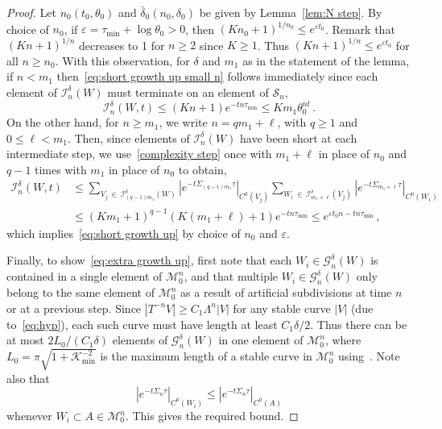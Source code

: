 \documentclass[10pt]{amsart}
\theoremstyle{definition}\newtheorem{defi}[theo]{Definition}\newtheorem{rema}[theo]{Remark}\newtheorem{exam}[theo]{Example}\newtheorem{exem}[theo]{Example}\newtheorem{nota}[theo]{Notation}
\newcommand{\cG}{\mathcal{G}}
\newcommand{\cI}{\mathcal{I}}
\newcommand{\cK}{\mathcal{K}}
\newcommand{\MM}{\mathcal{M}}
\newcommand{\cS}{\mathcal{S}}
\newcommand{\ve}{\varepsilon}
\begin{document}
\begin{proof}
Let $n_0(t_0,\theta_0)$ and $\bar\delta_0(n_0,\delta_0)$ be given by Lemma~\ref{lem:N step}. By choice of $n_0$, if $\ve = \tau_{\min} + \log \theta_0 > 0$, then $(Kn_0+1)^{1/n_0} \le e^{\ve t_0}$. Remark that $(Kn+1)^{1/n}$ decreases to 1 for $n \ge 2$ since $K \ge1$. Thus $(Kn+1)^{1/n} \le e^{\ve t_0}$ for all $n \ge n_0$. With this observation, for $\delta$ and $m_1$ as in the statement of the lemma, if $n < m_1$ then~\eqref{eq:short growth up small n} follows immediately since each element of $\cI^{\delta}_n(W)$ must terminate on an element of $\cS_{n}$,
\[
\cI^{\delta}_n(W,t) \le (Kn+1) e^{-tn \tau_{\min}} \le K m_1 \theta_0^{nt} \,.
\]
On the other hand, for $n \ge m_1$, we write $n = qm_1 + \ell$, with $q \ge 1$ and $0 \le \ell < m_1$. Then, since elements of $\cI_n^\delta(W)$ have been short at each intermediate step, we use~\eqref{complexity step} once with $m_1 + \ell$ in place of $n_0$ and $q-1$ times with $m_1$ in place of $n_0$ to obtain,
\begin{align*}
\cI^\delta_n(W, t) & \le \sum_{V_j\,\in\,\cI^\delta_{(q-1)m_1}(W)} \left| e^{-t \Sigma_{(q-1)m_1} \tau} \right|_{C^0(V_j)} \sum_{W_i\,\in\,\cI^\delta_{m_1+\ell}(V_j)} \left| e^{-t \Sigma_{m_1+\ell} \tau } \right|_{C^0(W_i)} \\
& \le (Km_1 +1)^{q-1}(K(m_1+\ell) + 1) e^{-t n \tau_{\min}} \le e^{\ve t_0 n - t n \tau_{\min}} \,,
\end{align*}
which implies~\eqref{eq:short growth up} by choice of $n_0$ and $\ve$.


Finally, to show~\eqref{eq:extra growth up}, first note that each $W_i \in \cG^\delta_n(W)$ is contained in a single element of $\MM_0^{n}$, and that multiple $W_i \in \cG^\delta_n(W)$ only belong to the same element of $\MM_0^n$ as a result of artificial subdivisions at time $n$ or at a previous step. Since $|T^{-n}V| \ge C_1 \Lambda^n |V|$ for any stable curve $|V|$ (due to~\eqref{eq:hyp}), each such curve must have length at least $C_1 \delta/2$. Thus there can be at most $2L_0/(C_1\delta)$ elements of $\cG^\delta_n(W)$ in one element of $\MM_0^{n}$, where $L_0 = \pi \sqrt{1 + \cK_{\min}^{-2}}$ is the maximum length of a stable curve in $\MM_0^n$ using~\cite[\S~3]{BD1}. Note also that
\[
\left|e^{-t \Sigma_n \tau}\right|_{C^0(W_i)} \le \left|e^{-t \Sigma_n \tau}\right|_{C^0(A)}
\]
whenever $W_i \subset A \in \MM_0^n$. This gives the required bound.
\end{proof}
\end{document}
